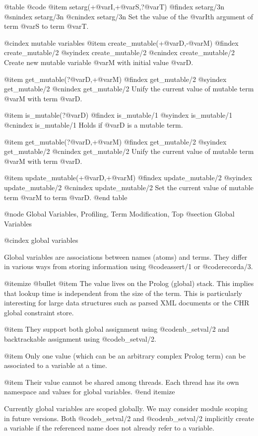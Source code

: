 {{{{{{@table @code
@item setarg(+@var{I},+@var{S},?@var{T})
@findex setarg/3n
@snindex setarg/3n
@cnindex setarg/3n
Set the value of the @var{I}th argument of term @var{S} to term @var{T}. 

@cindex mutable variables
@item create_mutable(+@var{D},-@var{M})
@findex create_mutable/2
@syindex create_mutable/2
@cnindex create_mutable/2
Create new mutable variable @var{M} with initial value @var{D}.

@item get_mutable(?@var{D},+@var{M})
@findex get_mutable/2
@syindex get_mutable/2
@cnindex get_mutable/2
Unify the current value of mutable term @var{M} with term @var{D}.

@item is_mutable(?@var{D})
@findex is_mutable/1
@syindex is_mutable/1
@cnindex is_mutable/1
Holds if @var{D} is a mutable term.

@item get_mutable(?@var{D},+@var{M})
@findex get_mutable/2
@syindex get_mutable/2
@cnindex get_mutable/2
Unify the current value of mutable term @var{M} with term @var{D}.

@item update_mutable(+@var{D},+@var{M})
@findex update_mutable/2
@syindex update_mutable/2
@cnindex update_mutable/2
Set the current value of mutable term @var{M} to term @var{D}.
@end table

@node Global Variables, Profiling, Term Modification, Top
@section Global Variables

@cindex global variables

Global variables are associations between names (atoms) and
terms. They differ in various ways from storing information using
@code{assert/1} or @code{recorda/3}.

@itemize @bullet
@item The value lives on the Prolog (global) stack. This implies that
lookup time is independent from the size of the term. This is
particularly interesting for large data structures such as parsed XML
documents or the CHR global constraint store. 

@item They support both global assignment using @code{nb_setval/2} and
backtrackable assignment using @code{b_setval/2}.

@item Only one value (which can be an arbitrary complex Prolog term)
can be associated to a variable at a time. 

@item Their value cannot be shared among threads. Each thread has its own
namespace and values for global variables.
@end itemize

Currently global variables are scoped globally. We may consider module
scoping in future versions.   Both @code{b_setval/2} and
@code{nb_setval/2} implicitly create a variable if the referenced name
does not already refer to a variable.

}}}}}}

